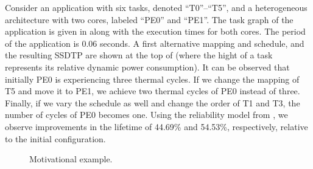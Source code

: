 Consider an application with six tasks, denoted ``T0''--``T5'', and a heterogeneous architecture with two cores, labeled ``PE0'' and ``PE1''. The task graph of the application is given in  along with the execution times for both cores. The period of the application is 0.06 seconds. A first alternative mapping and schedule, and the resulting SSDTP are shown at the top of  (where the hight of a task represents its relative dynamic power consumption). It can be observed that initially PE0 is experiencing three thermal cycles. If we change the mapping of T5 and move it to PE1, we achieve two thermal cycles of PE0 instead of three. Finally, if we vary the schedule as well and change the order of T1 and T3, the number of cycles of PE0 becomes one. Using the reliability model from , we observe improvements in the lifetime of 44.69\% and 54.53\%, respectively, relative to the initial configuration.
\begin{figure}
  \centering
  \vspace{-10pt}

  \caption{Motivational example.}
  \vspace{10pt}
\end{figure}
